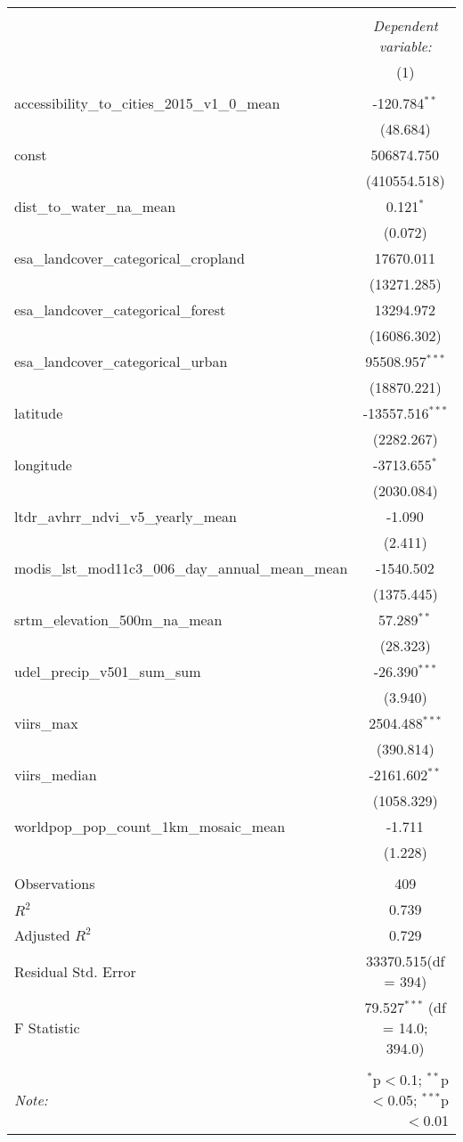 \begin{table}[!htbp] \centering
\begin{tabular}{@{\extracolsep{5pt}}lc}
\\[-1.8ex]\hline
\hline \\[-1.8ex]
& \multicolumn{1}{c}{\textit{Dependent variable:}} \
\cr \cline{1-2}
\\[-1.8ex] & (1) \\
\hline \\[-1.8ex]
 accessibility_to_cities_2015_v1_0_mean & -120.784$^{**}$ \\
  & (48.684) \\
 const & 506874.750$^{}$ \\
  & (410554.518) \\
 dist_to_water_na_mean & 0.121$^{*}$ \\
  & (0.072) \\
 esa_landcover_categorical_cropland & 17670.011$^{}$ \\
  & (13271.285) \\
 esa_landcover_categorical_forest & 13294.972$^{}$ \\
  & (16086.302) \\
 esa_landcover_categorical_urban & 95508.957$^{***}$ \\
  & (18870.221) \\
 latitude & -13557.516$^{***}$ \\
  & (2282.267) \\
 longitude & -3713.655$^{*}$ \\
  & (2030.084) \\
 ltdr_avhrr_ndvi_v5_yearly_mean & -1.090$^{}$ \\
  & (2.411) \\
 modis_lst_mod11c3_006_day_annual_mean_mean & -1540.502$^{}$ \\
  & (1375.445) \\
 srtm_elevation_500m_na_mean & 57.289$^{**}$ \\
  & (28.323) \\
 udel_precip_v501_sum_sum & -26.390$^{***}$ \\
  & (3.940) \\
 viirs_max & 2504.488$^{***}$ \\
  & (390.814) \\
 viirs_median & -2161.602$^{**}$ \\
  & (1058.329) \\
 worldpop_pop_count_1km_mosaic_mean & -1.711$^{}$ \\
  & (1.228) \\
\hline \\[-1.8ex]
 Observations & 409 \\
 $R^2$ & 0.739 \\
 Adjusted $R^2$ & 0.729 \\
 Residual Std. Error & 33370.515(df = 394)  \\
 F Statistic & 79.527$^{***}$ (df = 14.0; 394.0) \\
\hline
\hline \\[-1.8ex]
\textit{Note:} & \multicolumn{1}{r}{$^{*}$p$<$0.1; $^{**}$p$<$0.05; $^{***}$p$<$0.01} \\
\end{tabular}
\end{table}